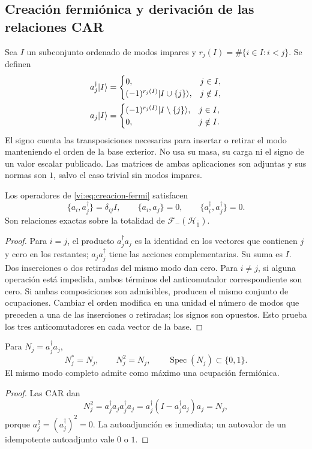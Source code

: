 \subsection{Creación fermiónica y derivación de las relaciones CAR}
\label{vi:subsec:car-construccion}

Sea \(I\) un subconjunto ordenado de modos impares y
\(r_j(I)=\#\{i\in I:i<j\}\). Se definen
\begin{align}
 a_j^\dagger|I\rangle&=
 \begin{cases}
 0,&j\in I,\\
 (-1)^{r_j(I)}|I\cup\{j\}\rangle,&j\notin I,
 \end{cases}\notag\\
 a_j|I\rangle&=
 \begin{cases}
 (-1)^{r_j(I)}|I\setminus\{j\}\rangle,&j\in I,\\
 0,&j\notin I.
 \end{cases}
 \label{vi:eq:creacion-fermi}
\end{align}
El signo cuenta las transposiciones necesarias para insertar o retirar
el modo manteniendo el orden de la base exterior. No usa su masa,
su carga ni el signo de un valor escalar publicado. Las matrices de
ambas aplicaciones son adjuntas y sus normas son \(1\), salvo el
caso trivial sin modos impares.

\begin{theorem}
\label{vi:thm:car-construidas}
Los operadores de \eqref{vi:eq:creacion-fermi} satisfacen
\[
 \{a_i,a_j^\dagger\}=\delta_{ij}I,\qquad
 \{a_i,a_j\}=0,\qquad
 \{a_i^\dagger,a_j^\dagger\}=0.
\]
Son relaciones exactas sobre la totalidad de
\(\mathcal F_-(\mathcal H_{\bar1})\).
\end{theorem}
\begin{proof}
Para \(i=j\), el producto \(a_j^\dagger a_j\) es la identidad
en los vectores que contienen \(j\) y cero en los restantes;
\(a_ja_j^\dagger\) tiene las acciones complementarias. Su suma
es \(I\). Dos inserciones o dos retiradas del mismo modo dan cero.
Para \(i\ne j\), si alguna operación está impedida, ambos términos
del anticomutador correspondiente son cero. Si ambas composiciones
son admisibles, producen el mismo conjunto de ocupaciones. Cambiar
el orden modifica en una unidad el número de modos que preceden a
una de las inserciones o retiradas; los signos son opuestos. Esto
prueba los tres anticomutadores en cada vector de la base.
\end{proof}

\begin{corollary}
\label{vi:cor:pauli-ocupacion}
Para \(N_j=a_j^\dagger a_j\),
\[
 N_j^*=N_j,\qquad N_j^2=N_j,\qquad
 \operatorname{Spec}(N_j)\subset\{0,1\}.
\]
El mismo modo completo admite como máximo una ocupación fermiónica.
\end{corollary}
\begin{proof}
Las CAR dan
\[
 N_j^2=a_j^\dagger a_ja_j^\dagger a_j
 =a_j^\dagger(I-a_j^\dagger a_j)a_j=N_j,
\]
porque \(a_j^2=(a_j^\dagger)^2=0\). La autoadjunción es inmediata;
un autovalor de un idempotente autoadjunto vale \(0\) o \(1\).
\end{proof}

